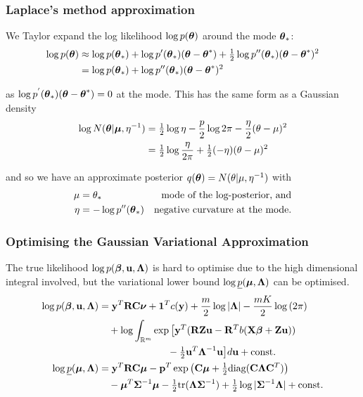 \documentclass{beamer}
\begin{document}
\begin{frame}
\frametitle{Laplace's method approximation}
We Taylor expand the log likelihood $\log{p({\boldsymbol\theta})}$ around the mode
${\boldsymbol \theta}_*$:
\begin{align*}
\log{p({\boldsymbol\theta})} &\approx \log{p({\boldsymbol\theta}_*)} + \log{p'({\boldsymbol\theta}_*)}({\boldsymbol \theta} - {\boldsymbol \theta}^*) + \tfrac{1}{2} \log{p''({\boldsymbol\theta}_*)}({\boldsymbol \theta} - {\boldsymbol \theta}^*)^2 \\
&= \log{p({\boldsymbol\theta}_*)} + \log{p''({\boldsymbol\theta}_*)}({\boldsymbol \theta} - {\boldsymbol \theta}^*)^2
\end{align*}

as $\log{p^{'}({\boldsymbol\theta}_*)}({\boldsymbol \theta} - {\boldsymbol \theta}^*) = 0$ at the mode. This has
the same form as a Gaussian density
\begin{align*}
\log{N({\boldsymbol\theta}|{\boldsymbol\mu}, \eta^{-1})} &= \tfrac{1}{2} \log{\eta} - \frac{p}{2} \log{2 \pi} - \frac{\eta}{2} (\theta-\mu)^2 \\
&= \tfrac{1}{2} \log{\frac{\eta}{2\pi}} + \tfrac{1}{2} (-\eta)(\theta - \mu)^2
\end{align*}

and so we have an approximate posterior $q({\boldsymbol \theta}) = N(\theta|\mu, \eta^{-1})$ with
\begin{align*}
\mu &= \theta_* & \text{mode of the log-posterior, and}\\
\eta &= -\log{p''({\boldsymbol\theta}_*)} & \text{negative curvature at the mode.} \\
\end{align*}
\end{frame}

\begin{frame}
\frametitle{Optimising the Gaussian Variational Approximation}
The true likelihood $\log p({\boldsymbol \beta}, {\bf u}, {\boldsymbol \Lambda})$ is hard to optimise due 
to the high dimensional integral involved, but the variational lower bound $\log \underline{p}({\boldsymbol \mu}, {\boldsymbol \Lambda})$ can be optimised.
\begin{align*}
\log p({\boldsymbol \beta}, {\bf u}, {\boldsymbol \Lambda}) &= {\bf y}^T {\bf R} {\bf C} {\boldsymbol \nu} + {\bf 1}^T c({\bf y}) + \frac{m}{2} \log |{\boldsymbol \Lambda}| - \frac{mK}{2} \log{(2 \pi)}\\
&\quad + \log  \int_{\mathbb{R}^{m}} \exp \big[ {\bf y}^T ({\bf R} {\bf Z} {\bf u} - {\bf R}^T b( {\bf X} {\boldsymbol \beta} + {\bf Z} {\bf u})) \\
 &\quad \quad \quad \quad \quad \quad \quad - \tfrac{1}{2} {{\bf u}^T {\boldsymbol \Lambda}^{-1} {\bf u} } \big] d {\bf u} + \text{const.}\\
\log \underline{p}({\boldsymbol \mu}, {\boldsymbol \Lambda}) &= {\bf y}^T {\bf R} {\bf C} {\boldsymbol \mu} - {\bf p}^T \exp{\left({\bf C}{\boldsymbol\mu}+  \tfrac{1}{2} \text{diag}{({\bf C}{\boldsymbol\Lambda}{\bf C}^T)}\right)} \\
& \quad - {\boldsymbol \mu}^T {\boldsymbol \Sigma}^{-1} {\boldsymbol \mu} - \tfrac{1}{2} \text{tr}{({\boldsymbol\Lambda}{\boldsymbol\Sigma}^{-1})} + \tfrac{1}{2} \log{|{\boldsymbol\Sigma}^{-1}{\boldsymbol\Lambda}|} + \text{const.} \\
\end{align*}
\end{frame}
\end{document}
